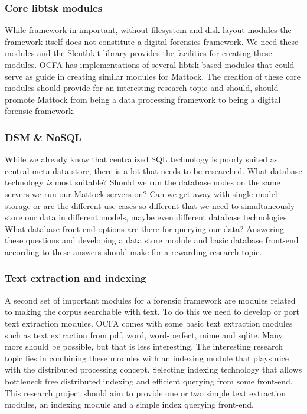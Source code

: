 \subsubsection{Core libtsk modules}
While framework in important, without filesystem and disk layout modules the framework itself does not constitute a digital forensics framework. We need these modules and the Sleuthkit library provides the facilities for creating these modules. OCFA has implementations of several libtsk based modules that could serve as guide in creating similar modules for Mattock. The creation of these core modules should provide for an interesting research topic and should, should promote Mattock from being a data processing framework to being a digital forensic framework.
\subsubsection{DSM \& NoSQL}
While we already know that centralized SQL technology is poorly suited as central meta-data store, there is a lot that needs to be researched. What database technology \emph{is} most suitable? Should we run the database nodes on the same servers we run our Mattock servers on? Can we get away with single model storage or are the different use cases so different that we need to simultaneously store our data in different models, maybe even different database technologies. What database front-end options are there for querying our data? Answering these questions and developing a data store module and basic database front-end according to these answers should make for a rewarding research topic.
\subsubsection{Text extraction and indexing}
A second set of important modules for a forensic framework are modules related to making the corpus searchable with text. To do this we need to develop or port text extraction modules. OCFA comes with some basic text extraction modules such as text extraction from pdf, word, word-perfect, mime and sqlite. Many more should be possible, but that is less interesting. The interesting research topic lies in combining these modules with an indexing module that plays nice with the distributed processing concept. Selecting indexing technology that allows bottleneck free distributed indexing and efficient querying from some front-end. This research project should aim to provide one or two simple text extraction modules, an indexing module and a simple index querying front-end.
